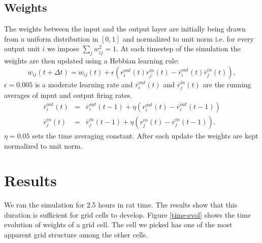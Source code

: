 \documentclass[a4paper, 12pt]{article}
\begin{document}
\subsection{Weights}
The weights between the input and the output layer are initially being drawn from a uniform distribution in $[0,1]$ and normalized to unit norm i.e. for every output unit $i$ we impose $\sum_jw^2_{ij}=1$. At each timestep of the simulation the weights are then updated using a Hebbian learning rule:  
\begin{equation}
w_{ij}(t+\Delta t)= w_{ij}(t)+ \epsilon(r_i^{out}(t)r_j^{in}(t)-\overline{r}_i^{out}(t)\overline{r}_j^{in}(t)),
\end{equation}
$\epsilon= 0.005$ is a moderate learning rate and $\overline{r}_i^{out}(t)$ and $\overline{r}_j^{in}(t)$ are the running averages of input and output firing rates.  
	\begin{eqnarray}
	\overline{r}_i^{out}(t) &=& \overline{r}_i^{out}(t-1)+ \eta(r_i^{out}(t)-\overline{r}_i^{out}(t-1))\\
	\overline{r}_j^{in}(t) &=& \overline{r}_j^{in}(t-1)+ \eta(r_j^{in}(t)-\overline{r}_j^{in}(t-1)).
	\end{eqnarray}
$\eta=0.05$ sets the time averaging constant. After each update the weights are kept normalized to unit norm. 
%
%
\section{Results}
We ran the simulation for 2.5 hours in rat time. The results show that this duration is sufficient for grid cells to develop. Figure \ref{time-evol} shows the time evolution of weights of a grid cell. The cell we picked has one of the most apparent grid structure among the other cells.
\end{document}
